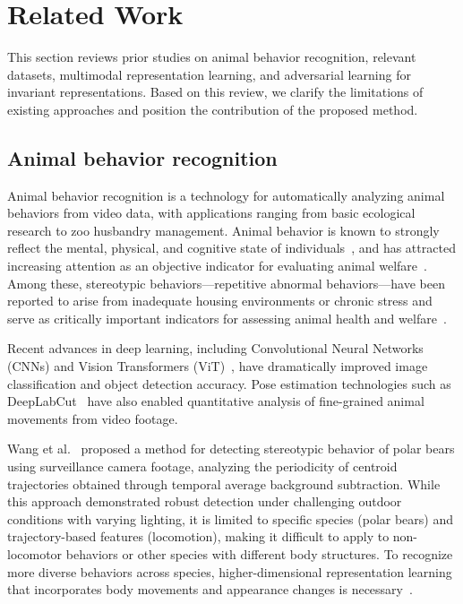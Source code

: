 \documentclass[twocolumn]{svjour3}
\begin{document}
\section{Related Work}
\label{sec:related}

This section reviews prior studies on animal behavior recognition, relevant datasets, multimodal representation learning, and adversarial learning for invariant representations.
Based on this review, we clarify the limitations of existing approaches and position the contribution of the proposed method.

\subsection{Animal behavior recognition}

Animal behavior recognition is a technology for automatically analyzing animal behaviors from video data, with applications ranging from basic ecological research to zoo husbandry management.
Animal behavior is known to strongly reflect the mental, physical, and cognitive state of individuals~\cite{broom1986indicators}, and has attracted increasing attention as an objective indicator for evaluating animal welfare~\cite{mellor2017updating}.
Among these, stereotypic behaviors---repetitive abnormal behaviors---have been reported to arise from inadequate housing environments or chronic stress and serve as critically important indicators for assessing animal health and welfare~\cite{mason1991stereotypies}.

Recent advances in deep learning, including Convolutional Neural Networks (CNNs) and Vision Transformers (ViT)~\cite{dosovitskiy2020vit}, have dramatically improved image classification and object detection accuracy.
Pose estimation technologies such as DeepLabCut~\cite{mathis2018deeplabcut} have also enabled quantitative analysis of fine-grained animal movements from video footage.

Wang et al.~\cite{wang2023polarbear} proposed a method for detecting stereotypic behavior of polar bears using surveillance camera footage, analyzing the periodicity of centroid trajectories obtained through temporal average background subtraction.
While this approach demonstrated robust detection under challenging outdoor conditions with varying lighting, it is limited to specific species (polar bears) and trajectory-based features (locomotion), making it difficult to apply to non-locomotor behaviors or other species with different body structures.
To recognize more diverse behaviors across species, higher-dimensional representation learning that incorporates body movements and appearance changes is necessary~\cite{bengio2013representation}.
\end{document}
